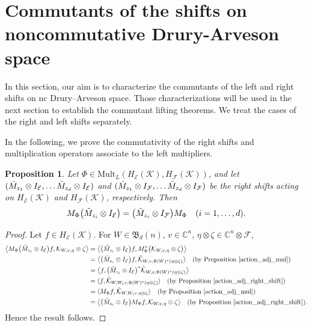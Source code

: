 \documentclass[12pt]{amsart}%
\newtheorem{proposition}[theorem]{Proposition}
\numberwithin{equation}{section}
\newcommand{\fB}{{\mathfrak{B}}}
\newcommand{\cle}{\mathcal{E}}
\newcommand{\clf}{\mathcal{F}}
\newcommand{\clk}{\mathcal{K}}
\newcommand{\C}{\mathbb{C}}
\newcommand\la{{\langle }}
\newcommand\ra{{\rangle}}
\begin{document}
\section{Commutants of the shifts on noncommutative Drury-Arveson space}\label{commutant}
In this section, our aim is to characterize the commutants of the left and right shifts on nc  Drury–Arveson space. Those characterizations will be used in the next section to establish the commutant lifting theorems. We treat the cases of the right and left shifts separately.

In the following, we prove the commutativity of the right shifts and multiplication operators associate to the left multipliers. 
\begin{proposition}\label{Left_mult_and_shift}
Let $\Phi\in \text{Mult}_L(H_\cle(\clk), H_\clf(\clk))$, and let $(\Tilde{M}_{z_1} \otimes I_{\cle}, \ldots \Tilde{M}_{z_d}\otimes I_{\cle})$ and $(\Tilde{M}_{z_1} \otimes I_{\clf}, \ldots \Tilde{M}_{z_d}\otimes I_{\clf})$ be the right shifts acting on $H_\cle(\clk)$ and $H_\clf(\clk)$, respectively. Then
\[
M_\Phi \big (\Tilde{M}_{z_i} \otimes I_{\cle}\big)= \big(\Tilde{M}_{z_i} \otimes I_{\clf}\big) M_\Phi \quad (i=1, \ldots, d).
\]

\end{proposition}

\begin{proof}
Let $f\in H_\cle(\clk)$. For $W\in\fB_d(n)$, $v\in \C^n$, $\eta \otimes \zeta \in \C^n\otimes \clf$,
\begingroup
 \allowdisplaybreaks
\begin{align*}
\big\langle M_\Phi \big (\Tilde{M}_{z_i}  \otimes I_{\cle}\big)f, \clk_{W, v, \eta}\otimes \zeta\big\rangle &=\big \langle \big ( \Tilde{M}_{z_i} \otimes I_{\cle}\big) f, M^*_\Phi \big( \clk_{W,v, \eta}\otimes \zeta\big )\big\rangle \\
&= \big\langle \big ( \Tilde{M}_{z_i} \otimes I_{\cle}\big) f, \Tilde{\clk}_{W,v, \Phi(W)^*(\eta\otimes \zeta)}\big\rangle \quad (\text{by Proposition }\ref{action_adj_mul})\\
&= \big\langle f,  \big ( \Tilde{M}_{z_i} \otimes I_{\cle}\big)^* \Tilde{\clk}_{W,v, \Phi(W)^*(\eta\otimes \zeta)}\big\rangle\\
&= \la f,   \Tilde{\clk}_{W,W_iv, \Phi(W)^*(\eta\otimes \zeta)}\ra\quad (\text{by Proposition }\ref{action_adj_right_shift})\\
&= \la M_{\Phi}f,   \Tilde{\clk}_{W,W_iv, \eta\otimes \zeta}\ra\quad (\text{by Proposition }\ref{action_adj_mul})\\
&= \big\langle \big (\Tilde{M}_{z_i}  \otimes I_{\cle}\big)M_{\Phi}f,  \clk_{W, v, \eta}\otimes \zeta\big\rangle\quad (\text{by Proposition }\ref{action_adj_right_shift}).
\end{align*}
\endgroup
Hence the result follows.
\end{proof}
\end{document}
